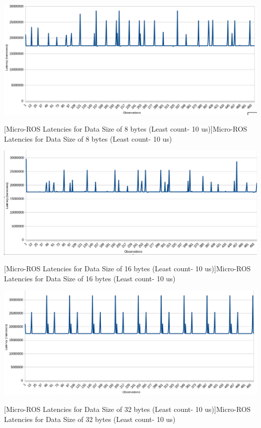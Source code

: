 \documentclass[%
xelatex,
	oneside,		%
	12pt,			%
	parskip=half,	%
	abstracton,
	chapterprefix=true%
    appendixprefix=true]
{scrbook}
\begin{document}
\begin{center}
\includegraphics[scale=0.32]{fig/uros8byte.png}

[Micro-ROS Latencies for Data Size of 8 bytes (Least count- 10 us)]{Micro-ROS Latencies for Data Size of 8 bytes (Least count- 10 us)}
\label{fig:uros8byte}
\end{center}


\begin{center}
\includegraphics[scale=0.32]{fig/uros16byte.png}

[Micro-ROS Latencies for Data Size of 16 bytes (Least count- 10 us)]{Micro-ROS Latencies for Data Size of 16 bytes (Least count- 10 us)}
\label{fig:uros16byte}
\end{center}

\begin{center}
\includegraphics[scale=0.32]{fig/uros32byte.png}

[Micro-ROS Latencies for Data Size of 32 bytes (Least count- 10 us)]{Micro-ROS Latencies for Data Size of 32 bytes (Least count- 10 us)}
\label{fig:uros32byte}
\end{center}
\end{document}
